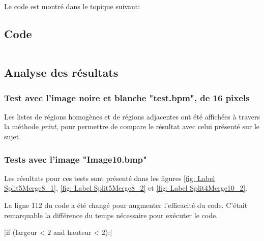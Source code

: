 \documentclass{rapportECL}
\begin{document}
Le code est montré dans le topique suivant:

\subsection{Code}

\inputminted[linenos=True]{python}{scr/cah.py}

\subsection{Analyse des résultats}

\subsubsection{Test avec l'image noire et blanche "test.bpm", de 16 pixels}

Les listes de régions homogènes et de régions adjacentes ont été affichées à travers la méthode \textit{print}, pour permettre de compare le résultat avec celui présenté sur le sujet.



\subsubsection{Tests avec l'image "Image10.bmp"}

Les résultats pour ces tests sont présenté dans les figures \ref{fig: Label Split5Merge8_1}, \ref{fig: Label Split5Merge8_2} et \ref{fig: Label Split4Merge10_2}.

La ligne 112 du code a été changé pour augmenter l'efficacité du code. C'était  remarquable la différence du temps nécessaire pour exécuter le code.

|if (largeur < 2 and hauteur < 2):|
\end{document}
